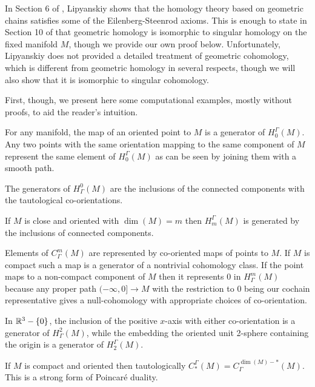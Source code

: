 In Section 6 of \cite{Lipy14}, Lipyanskiy shows that the homology theory based on geometric chains satisfies some of the Eilenberg-Steenrod axioms. This is enough to state in Section 10 of \cite{Lipy14} that geometric homology is isomorphic to singular homology on the fixed manifold $M$, though we provide our own proof below. Unfortunately, Lipyanskiy does not provided a detailed treatment of geometric cohomology, which is different from geometric homology in several respects, though we will also show that it is isomorphic to singular cohomology.

First, though, we present here  some computational examples, mostly without proofs, to aid the reader's intuition.

\begin{example}\label{E: first examples}


For any manifold, the map of an oriented point to $M$ is a generator of $H_0^\Gamma(M)$. Any two points with the same orientation mapping to the same component of $M$ represent the same element of $H_0^\Gamma(M)$ as can be seen by joining them with a smooth path.



The generators of $H^0_\Gamma(M)$ are the inclusions of the connected components with the tautological co-orientations.

If $M$ is close  and oriented with $\dim(M)=m$ then $H_m^\Gamma(M)$ is generated by the inclusions of connected components.

Elements of $C_\Gamma^m(M)$ are represented by co-oriented maps of points to $M$. If $M$ is compact such a map is a generator of a nontrivial cohomology class. If the point maps to a non-compact component of $M$ then it represents $0$ in $H_\Gamma^m(M)$ because any proper path $(-\infty,0]\to M$ with the restriction to $0$ being our cochain representative gives a null-cohomology with appropriate choices of co-orientation.

In $\mathbb{R}^3-\{0\}$, the inclusion of the positive $x$-axis with either co-orientation is a generator of $H_\Gamma^2(M)$, while the embedding the oriented unit 2-sphere containing the origin is a generator of $H_2^\Gamma(M)$.

If $M$ is compact and oriented then tautologically $C_*^\Gamma(M)=C_\Gamma^{\dim(M)-*}(M)$. This is a strong form of Poincar\'e duality.
\end{example}

